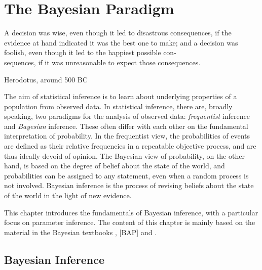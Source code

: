 \chapter{The Bayesian Paradigm}\label{chap:bayesian}

\epigraph{A decision was wise, even though it led to disastrous consequences, if the evidence at hand indicated it was the best one to make; and a decision was foolish, even though it led to the happiest possible con-\\sequences, if it was unreasonable to expect those consequences.}{Herodotus, around 500 BC}


The aim of statistical inference is to learn about underlying properties of a population from observed data.  In statistical inference, there are, broadly speaking, two paradigms for the analysis of observed data: \textit{frequentist} inference and \textit{Bayesian} inference. These often differ with each other on the fundamental interpretation of probability. In the frequentist view, the probabilities of events are defined as their relative frequencies in a repeatable objective process, and are thus ideally devoid of opinion. The Bayesian view of probability, on the other hand, is based on the degree of belief about the state of the world, and probabilities can be assigned to any statement, even when a random process is not involved. Bayesian inference is the process of revising beliefs about the state of the world in the light of new evidence.   

This chapter introduces the fundamentals of Bayesian inference, with a particular focus on parameter inference. The content of this chapter is mainly based on the material in the Bayesian textbooks \cite{BDA}, [BAP] and \cite{Sivia}. %


\section{Bayesian Inference}\label{sec:bayes_paradigm}

